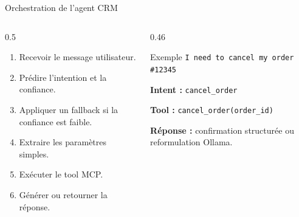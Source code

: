 \documentclass[aspectratio=169,10pt]{beamer}
\begin{document}
\begin{frame}{Orchestration de l'agent CRM}
    \begin{columns}[T]
        \begin{column}{0.5\textwidth}
            \begin{enumerate}
                \item Recevoir le message utilisateur.
                \item Prédire l'intention et la confiance.
                \item Appliquer un fallback si la confiance est faible.
                \item Extraire les paramètres simples.
                \item Exécuter le tool MCP.
                \item Générer ou retourner la réponse.
            \end{enumerate}
        \end{column}
        \begin{column}{0.46\textwidth}
            \begin{block}{Exemple}
                \texttt{I need to cancel my order \#12345}

                \vspace{0.2cm}
                \textbf{Intent :} \texttt{cancel\_order}

                \textbf{Tool :} \texttt{cancel\_order(order\_id)}

                \textbf{Réponse :} confirmation structurée ou reformulation Ollama.
            \end{block}
        \end{column}
    \end{columns}
\end{frame}
\end{document}
